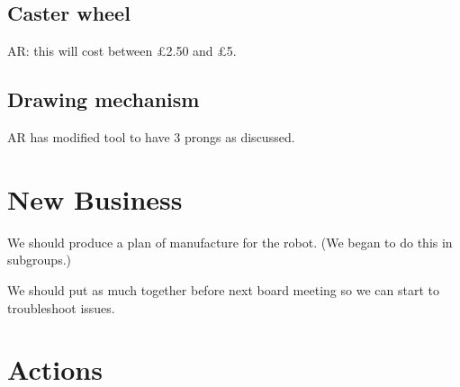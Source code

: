 \documentclass[a4paper,11pt,twoside,class=meetingmins,crop=false]{standalone}
\begin{document}
\begin{items}
    \subsection{Caster wheel}
        \item AR: this will cost between \pounds{2.50} and \pounds{5}.

    \subsection{Drawing mechanism}
        \item AR has modified tool to have 3 prongs as discussed.
    \end{items}

\section{New Business}
    \begin{items}
        \item We should produce a plan of manufacture for the robot. (We began to do this in subgroups.)
        \item We should put as much together before next board meeting so we can start to troubleshoot issues.
    \end{items}


\vspace{1em}
\vspace{1em}

\section{Actions}
\begin{items}
\end{items}
\end{document}
